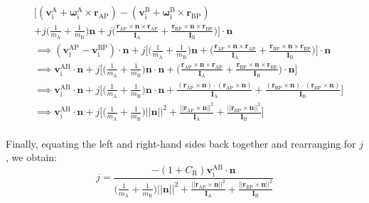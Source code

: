 \documentclass[12pt]{article}
\begin{document}
\begin{equation*}
\begin{aligned}
& \bigg[(\mathbf{v}^\mathrm{A}_\mathrm{i} + \boldsymbol{\omega}^\mathrm{A}_\mathrm{i} \times \mathbf{r}_\mathrm{AP}) - (\mathbf{v}^\mathrm{B}_\mathrm{i} + \boldsymbol{\omega}^\mathrm{B}_\mathrm{i} \times \mathbf{r}_\mathrm{BP}) \\
& + j\bigg(\frac{1}{m_\mathrm{A}} + \frac{1}{m_\mathrm{B}}\bigg)\mathbf{n} + j\bigg(\frac{\mathbf{r}_\mathrm{AP} \times \mathbf{n} \times \mathbf{r}_\mathrm{AP}}{\mathbf{I}_\mathrm{A}} + \frac{\mathbf{r}_\mathrm{BP} \times \mathbf{n} \times \mathbf{r}_\mathrm{BP}}{\mathbf{I}_\mathrm{B}}\bigg)\bigg] \cdot \mathbf{n} \\
& \implies (\mathbf{v}^\mathrm{AP}_\mathrm{i} - \mathbf{v}^\mathrm{BP}_\mathrm{i}) \cdot \mathbf{n} + j \bigg[\bigg(\frac{1}{m_\mathrm{A}} + \frac{1}{m_\mathrm{B}}\bigg)\mathbf{n} + \bigg(\frac{\mathbf{r}_\mathrm{AP} \times \mathbf{n} \times \mathbf{r}_\mathrm{AP}}{\mathbf{I}_\mathrm{A}} + \frac{\mathbf{r}_\mathrm{BP} \times \mathbf{n} \times \mathbf{r}_\mathrm{BP}}{\mathbf{I}_\mathrm{B}}\bigg)\bigg] \cdot \mathbf{n} \\
& \implies \mathbf{v}^\mathrm{AB}_\mathrm{i} \cdot \mathbf{n} + j \bigg[\bigg(\frac{1}{m_\mathrm{A}} + \frac{1}{m_\mathrm{B}}\bigg)\mathbf{n} \cdot \mathbf{n} + \bigg(\frac{\mathbf{r}_\mathrm{AP} \times \mathbf{n} \times \mathbf{r}_\mathrm{AP}}{\mathbf{I}_\mathrm{A}} + \frac{\mathbf{r}_\mathrm{BP} \times \mathbf{n} \times \mathbf{r}_\mathrm{BP}}{\mathbf{I}_\mathrm{B}}\bigg) \cdot \mathbf{n} \bigg] \\
& \implies \mathbf{v}^\mathrm{AB}_\mathrm{i} \cdot \mathbf{n} + j \bigg[\bigg(\frac{1}{m_\mathrm{A}} + \frac{1}{m_\mathrm{B}}\bigg)\mathbf{n} \cdot \mathbf{n} + \frac{(\mathbf{r}_\mathrm{AP} \times \mathbf{n}) \cdot (\mathbf{r}_\mathrm{AP} \times \mathbf{n})}{\mathbf{I}_\mathrm{A}} + \frac{(\mathbf{r}_\mathrm{BP} \times \mathbf{n}) \cdot (\mathbf{r}_\mathrm{BP} \times \mathbf{n})}{\mathbf{I}_\mathrm{B}}\bigg] \\
& \implies \mathbf{v}^\mathrm{AB}_\mathrm{i} \cdot \mathbf{n} + j \bigg[\bigg(\frac{1}{m_\mathrm{A}} + \frac{1}{m_\mathrm{B}}\bigg)||\mathbf{n}||^2 + \frac{||\mathbf{r}_\mathrm{AP} \times \mathbf{n}||^2}{\mathbf{I}_\mathrm{A}} + \frac{||\mathbf{r}_\mathrm{BP} \times \mathbf{n}||^2}{\mathbf{I}_\mathrm{B}}\bigg]
\end{aligned}
\end{equation*}
\\
\noindent
Finally, equating the left and right-hand sides back together and rearranging for $j$, we obtain:
\\
\begin{equation*}
j = \frac{-(1 + C_\mathrm{R}) \mathbf{v}^\mathrm{AB}_\mathrm{i} \cdot \mathbf{n}}{\big(\frac{1}{m_\mathrm{A}} + \frac{1}{m_\mathrm{B}}\big)||\mathbf{n}||^2 + \frac{||\mathbf{r}_\mathrm{AP} \times \mathbf{n}||^2}{\mathbf{I}_\mathrm{A}} + \frac{||\mathbf{r}_\mathrm{BP} \times \mathbf{n}||^2}{\mathbf{I}_\mathrm{B}}}
\end{equation*}
\end{document}
